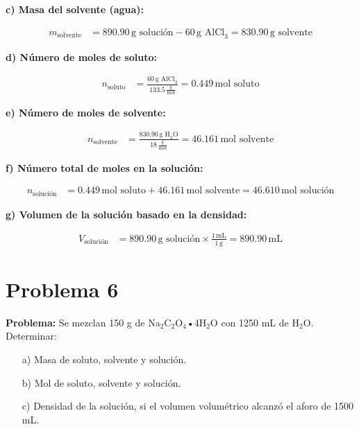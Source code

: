 \documentclass{article}
\begin{document}
\textbf{c) Masa del solvente (agua):}

\begin{align*}
    m_{\text{solvente}} &= 890.90 \, \text{g solución} - 60 \, \text{g AlCl}_3 = 830.90 \, \text{g solvente}
\end{align*}

\textbf{d) Número de moles de soluto:}

\begin{align*}
    n_{\text{soluto}} &= \frac{60 \, \text{g AlCl}_3}{133.5 \, \frac{\text{g}}{\text{mol}}} = 0.449 \, \text{mol soluto}
\end{align*}

\textbf{e) Número de moles de solvente:}

\begin{align*}
    n_{\text{solvente}} &= \frac{830.90 \, \text{g H}_2\text{O}}{18 \, \frac{\text{g}}{\text{mol}}} = 46.161 \, \text{mol solvente}
\end{align*}

\textbf{f) Número total de moles en la solución:}

\begin{align*}
    n_{\text{solución}} &= 0.449 \, \text{mol soluto} + 46.161 \, \text{mol solvente} = 46.610 \, \text{mol solución}
\end{align*}

\textbf{g) Volumen de la solución basado en la densidad:}

\begin{align*}
    V_{\text{solución}} &= 890.90 \, \text{g solución} \times \frac{1 \, \text{mL}}{1 \, \text{g}} = 890.90 \, \text{mL}
\end{align*}











\newpage
\section*{Problema 6}
\textbf{Problema:}
Se mezclan 150 g de Na$_2$C$_2$O$_4$•4H$_2$O con 1250 mL de H$_2$O. Determinar:

\begin{itemize} \item[a)] Masa de soluto, solvente y solución. \item[b)] Mol de soluto, solvente y solución. \item[c)] Densidad de la solución, si el volumen volumétrico alcanzó el aforo de 1500 mL. \end{itemize}
\end{document}
